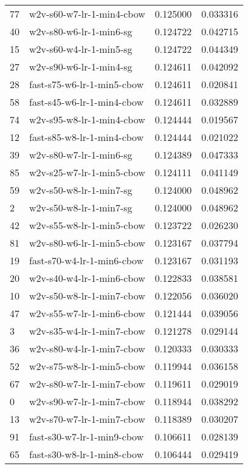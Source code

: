 \begin{tabular}{llrr}
77 &    w2v-s60-w7-lr-1-min4-cbow &  0.125000 &  0.033316 \\
40 &      w2v-s80-w6-lr-1-min6-sg &  0.124722 &  0.042715 \\
15 &      w2v-s60-w4-lr-1-min5-sg &  0.124722 &  0.044349 \\
27 &      w2v-s90-w6-lr-1-min4-sg &  0.124611 &  0.042092 \\
28 &   fast-s75-w6-lr-1-min5-cbow &  0.124611 &  0.020841 \\
58 &   fast-s45-w6-lr-1-min4-cbow &  0.124611 &  0.032889 \\
74 &    w2v-s95-w8-lr-1-min4-cbow &  0.124444 &  0.019567 \\
12 &   fast-s85-w8-lr-1-min4-cbow &  0.124444 &  0.021022 \\
39 &      w2v-s80-w7-lr-1-min6-sg &  0.124389 &  0.047333 \\
85 &    w2v-s25-w7-lr-1-min5-cbow &  0.124111 &  0.041149 \\
59 &      w2v-s50-w8-lr-1-min7-sg &  0.124000 &  0.048962 \\
2  &      w2v-s50-w8-lr-1-min7-sg &  0.124000 &  0.048962 \\
42 &    w2v-s55-w8-lr-1-min5-cbow &  0.123722 &  0.026230 \\
81 &    w2v-s80-w6-lr-1-min5-cbow &  0.123167 &  0.037794 \\
19 &   fast-s70-w4-lr-1-min6-cbow &  0.123167 &  0.031193 \\
20 &    w2v-s40-w4-lr-1-min6-cbow &  0.122833 &  0.038581 \\
10 &    w2v-s50-w8-lr-1-min7-cbow &  0.122056 &  0.036020 \\
47 &    w2v-s55-w7-lr-1-min6-cbow &  0.121444 &  0.039056 \\
3  &    w2v-s35-w4-lr-1-min7-cbow &  0.121278 &  0.029144 \\
36 &    w2v-s80-w4-lr-1-min7-cbow &  0.120333 &  0.030333 \\
52 &    w2v-s75-w8-lr-1-min5-cbow &  0.119944 &  0.036158 \\
67 &    w2v-s80-w7-lr-1-min7-cbow &  0.119611 &  0.029019 \\
0  &    w2v-s90-w7-lr-1-min7-cbow &  0.118944 &  0.038292 \\
13 &    w2v-s70-w7-lr-1-min7-cbow &  0.118389 &  0.030207 \\
91 &   fast-s30-w7-lr-1-min9-cbow &  0.106611 &  0.028139 \\
65 &   fast-s30-w8-lr-1-min8-cbow &  0.106444 &  0.029419 \\

\end{tabular}
